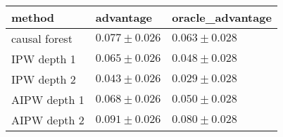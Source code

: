 \begin{table}[ht]
\centering
\begin{tabular}{lll}
  \hline
method & advantage & oracle_advantage \\ 
  \hline
causal forest & $ 0.077 \pm 0.026 $ & $ 0.063 \pm 0.028 $ \\ 
  IPW depth 1 & $ 0.065 \pm 0.026 $ & $ 0.048 \pm 0.028 $ \\ 
  IPW depth 2 & $ 0.043 \pm 0.026 $ & $ 0.029 \pm 0.028 $ \\ 
  AIPW depth 1 & $ 0.068 \pm 0.026 $ & $ 0.050 \pm 0.028 $ \\ 
  AIPW depth 2 & $ 0.091 \pm 0.026 $ & $ 0.080 \pm 0.028 $ \\ 
   \hline
\end{tabular}
\end{table}
